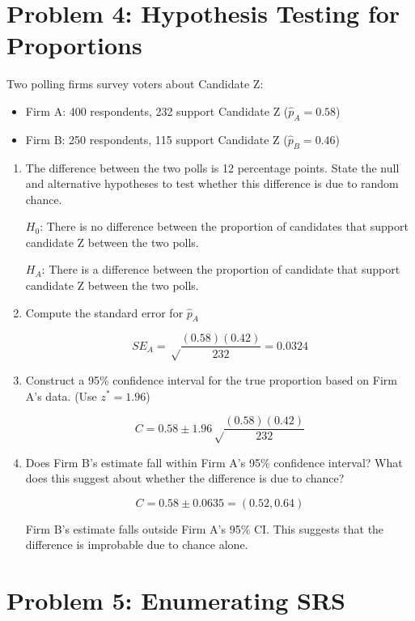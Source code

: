 \documentclass{article}
\begin{document}
\newpage

\section*{Problem 4: Hypothesis Testing for Proportions}

Two polling firms survey voters about Candidate Z:
\begin{itemize}
    \item Firm A: 400 respondents, 232 support Candidate Z ($\hat{p}_A = 0.58$)
    \item Firm B: 250 respondents, 115 support Candidate Z ($\hat{p}_B = 0.46$)
\end{itemize}

\begin{enumerate}[label=(\alph*)]
    \item The difference between the two polls is 12 percentage points. State the null and alternative hypotheses to test whether this difference is due to random chance.

    $H_0$: There is no difference between the proportion of candidates that support candidate Z between the two polls.

    $H_A$: There is a difference between the proportion of candidate that support candidate Z between the two polls. 

    \item Compute the standard error for $\hat{p}_A$

    \[
        SE_A = \sqrt\frac{(0.58)(0.42)}{232} = 0.0324
    \]
    \item Construct a 95\% confidence interval for the true proportion based on Firm A's data. (Use $z^* = 1.96$)

    \[
        C = 0.58 \pm 1.96 \sqrt\frac{(0.58)(0.42)}{232}
    \]


    \item Does Firm B's estimate fall within Firm A's 95\% confidence interval? What does this suggest about whether the difference is due to chance?

    \[
       C =  0.58 \pm 0.0635 = (0.52, 0.64)
    \]

    Firm B's estimate falls outside Firm A's 95\% CI. This suggests that the difference is improbable due to chance alone.
    
\end{enumerate}

\newpage

\section*{Problem 5: Enumerating SRS}
\end{document}
